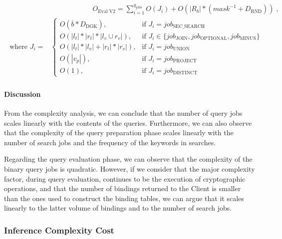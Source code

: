 \begin{align}
    \label{equation:query-evaluation-v2-final}
    \begin{split}
        & \quad \quad \quad \quad \quad \quad O_{\text{Eval V2}} = \sum_{i=1}^{q_{\text{jobs}}} O\left(J_i\right) + O\left( |R_b|* ( mask^{-1} + D_{\text{RND}}) \right)\;,\\
        \text{where } J_i =&
                    \begin{cases}
                        O\left( \overline{b} * D_{\text{DGK}} \right), & \text{if } J_i = job_{\text{SEC\_SEARCH}} \\
                        O\left(|l_t| * |r_t| * |l_v \cup r_v|\right), & \text{if } J_i \in \{job_{\text{JOIN}}, job_{\text{OPTIONAL}}, job_{\text{MINUS}}\} \\
                        O\left(|l_t| * |l_v| + |r_t| * |r_v|\right), & \text{if } J_i = job_{\text{UNION}} \\
                        O\left(|v_p|\right), & \text{if } J_i = job_{\text{PROJECT}} \\
                        O\left(1\right), & \text{if } J_i = job_{\text{DISTINCT}}
                    \end{cases}
    \end{split}
\end{align}

\paragraph{Discussion} From the complexity analysis, we can conclude that the number of query jobs scales linearly with the contents of the queries. Furthermore, we can also observe that the complexity of the query preparation phase scales linearly with the number of search jobs and the frequency of the keywords in searches.

Regarding the query evaluation phase, we can observe that the complexity of the binary query jobs is quadratic. However, if we consider that the major complexity factor, during query evaluation, continues to be the execution of cryptographic operations, and that the number of bindings returned to the Client is smaller than the ones used to construct the binding tables, we can argue that it scales linearly to the latter volume of bindings and to the number of search jobs.  

\subsubsection{Inference Complexity Cost}

